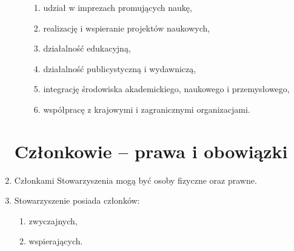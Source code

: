 \documentclass[chapterprefix,notitlepage]{article}
\begin{document}
\begin{enumerate}
\begin{enumerate}
\begin{enumerate}
			\item udział w imprezach promujących naukę,
			\item realizację i wspieranie projektów naukowych,
			\item działalność edukacyjną,
			\item działalność publicystyczną i wydawniczą,
			\item integrację środowiska akademickiego, naukowego i przemysłowego,
			\item współpracę z krajowymi i zagranicznymi organizacjami.
		\end{enumerate}
	\end{enumerate}
	
	
\section{Członkowie -- prawa i obowiązki}	
	
	\item Członkami Stowarzyszenia mogą być osoby fizyczne oraz prawne.
	
	\item Stowarzyszenie posiada członków:
	\begin{enumerate}[1)]
		\item zwyczajnych,
		\item wspierających.
	\end{enumerate}


\end{enumerate}
\end{document}
